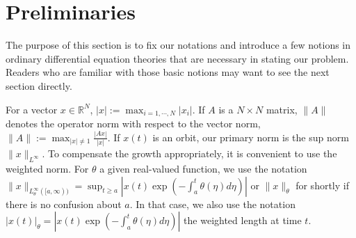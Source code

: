 \documentclass[a4paper,11pt]{article}
\newcounter{Theorem}
\theoremstyle{remark}
\begin{document}
% 
% 
% 
% 



\section{Preliminaries} \label{section2}

The purpose of this section is to fix our notations and introduce a few notions in ordinary differential equation theories that are necessary in stating our problem. Readers who are familiar with those basic notions may want to see the next section directly.

For a vector $x \in \mathbb{R}^N$, $|x|:=\displaystyle\max_{i=1,\cdots,N} |x_i|$. If $A$ is a $N\times N$ matrix, $\|A\|$ denotes the operator norm with respect to the vector norm, $\|A\|:= \displaystyle\max_{|x|\ne 1} \frac{ |Ax|}{|x|}$. If $x(t)$ is an orbit, our primary norm is the sup norm $\|x\|_{L^\infty}$. To compensate the growth appropriately, it is convenient to use the weighted norm. For $\theta$ a given real-valued function, we use the notation $\displaystyle\|x\|_{L^\infty_\theta([a,\infty))} = \sup_{t\ge a} \left|x(t) \exp\left( -\int_a^t \theta(\eta) d\eta\right)\right|$ or $\|x\|_\theta$ for shortly if there is no confusion about $a$. In that case, we also use the notation $|x(t)|_\theta = \left|x(t) \exp\left( -\int_a^t \theta(\eta) d\eta\right)\right|$ the weighted length at time $t$. 
\end{document}
